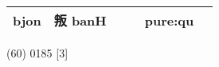\documentclass[14pt,a4paper]{scrartcl}
\begin{document}
\begin{longtable}[c]{@{}llllll@{}}
\begin{minipage}[t]{0.14\columnwidth}
bjon
\strut\end{minipage} &
\begin{minipage}[t]{0.14\columnwidth}\raggedright\strut
叛 banH
\strut\end{minipage} &
\begin{minipage}[t]{0.14\columnwidth}\raggedright\strut
\strut\end{minipage} &
\begin{minipage}[t]{0.14\columnwidth}\raggedright\strut
\strut\end{minipage} &
\begin{minipage}[t]{0.14\columnwidth}\raggedright\strut
pure:qu
\strut\end{minipage}\tabularnewline
\bottomrule
\end{longtable}

(60) 0185 {[}3{]}
\end{document}

